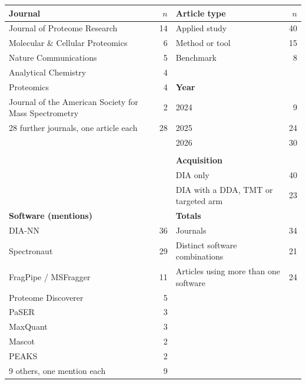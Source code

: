 \begin{tabular}{lr@{\hspace{2.2em}}lr}
\toprule
\textbf{Journal} & \textbf{$n$} & \textbf{Article type} & \textbf{$n$} \\
\midrule
Journal of Proteome Research & 14 & Applied study & 40 \\
Molecular \& Cellular Proteomics & 6 & Method or tool & 15 \\
Nature Communications & 5 & Benchmark & 8 \\
Analytical Chemistry & 4 &  &  \\
Proteomics & 4 & \textbf{Year} &  \\
Journal of the American Society for Mass Spectrometry & 2 & 2024 & 9 \\
28 further journals, one article each & 28 & 2025 & 24 \\
 &  & 2026 & 30 \\
 &  &  &  \\
 &  & \textbf{Acquisition} &  \\
 &  & DIA only & 40 \\
 &  & DIA with a DDA, TMT or targeted arm & 23 \\
\midrule
\textbf{Software (mentions)} &  & \textbf{Totals} &  \\
DIA-NN & 36 & Journals & 34 \\
Spectronaut & 29 & Distinct software combinations & 21 \\
FragPipe / MSFragger & 11 & Articles using more than one software & 24 \\
Proteome Discoverer & 5 &  &  \\
PaSER & 3 &  &  \\
MaxQuant & 3 &  &  \\
Mascot & 2 &  &  \\
PEAKS & 2 &  &  \\
9 others, one mention each & 9 &  &  \\
\bottomrule
\end{tabular}
